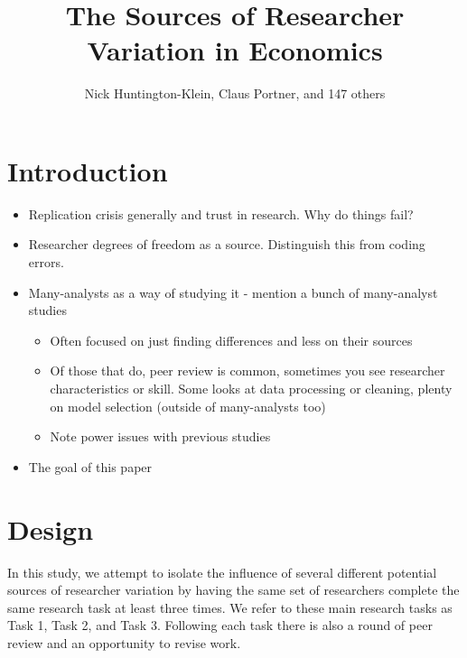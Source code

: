 \documentclass[
  letterpaper,
  DIV=11,
  numbers=noendperiod]{scrartcl}
\title{The Sources of Researcher Variation in Economics}
\author{Nick Huntington-Klein, Claus Portner, and 147 others}
\date{}
\begin{document}
\maketitle
\ifdefined\Shaded\renewenvironment{Shaded}{\begin{tcolorbox}[interior hidden, sharp corners, breakable, enhanced, frame hidden, boxrule=0pt, borderline west={3pt}{0pt}{shadecolor}]}{\end{tcolorbox}}\fi

\hypertarget{introduction}{%
\section{Introduction}\label{introduction}}

\begin{itemize}
\item
  Replication crisis generally and trust in research. Why do things
  fail?
\item
  Researcher degrees of freedom as a source. Distinguish this from
  coding errors.
\item
  Many-analysts as a way of studying it - mention a bunch of
  many-analyst studies

  \begin{itemize}
  \item
    Often focused on just finding differences and less on their sources
  \item
    Of those that do, peer review is common, sometimes you see
    researcher characteristics or skill. Some looks at data processing
    or cleaning, plenty on model selection (outside of many-analysts
    too)
  \item
    Note power issues with previous studies
  \end{itemize}
\item
  The goal of this paper
\end{itemize}

\hypertarget{design}{%
\section{Design}\label{design}}

In this study, we attempt to isolate the influence of several different
potential sources of researcher variation by having the same set of
researchers complete the same research task at least three times. We
refer to these main research tasks as Task 1, Task 2, and Task 3.
Following each task there is also a round of peer review and an
opportunity to revise work.
\end{document}
